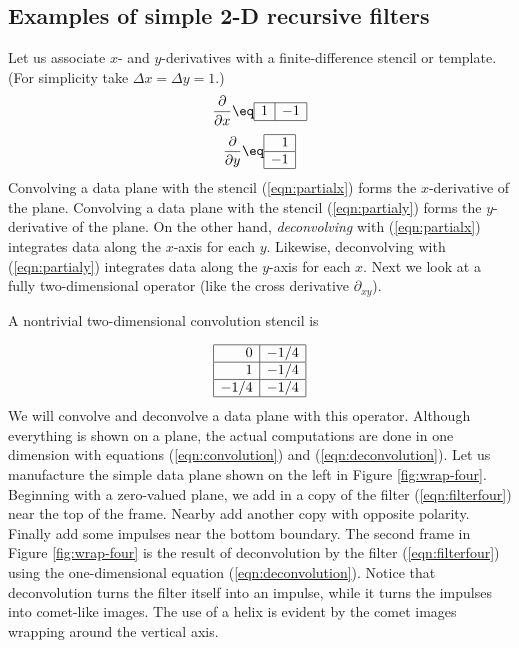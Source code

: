 \subsection{Examples of simple 2-D recursive filters}
Let us associate $x$- and $y$-derivatives with
a finite-difference stencil or template.
(For simplicity take $\Delta x=\Delta y=1$.)
\begin{equation}
 {\partial \over \partial x } \eq
 \begin{array}{|c|c|} \hline
   1    & -1
   \\ \hline
 \end{array}
 \label{eqn:partialx}
\end{equation}
\begin{equation}
  {\partial \over \partial y } \eq
  \begin{array}{|r|} \hline
    1  \\
    \hline
    -1
    \\ \hline
  \end{array}
  \label{eqn:partialy}
\end{equation}
Convolving a data plane with
the stencil (\ref{eqn:partialx})
forms the $x$-derivative of the plane.
Convolving a data plane with
the stencil (\ref{eqn:partialy})
forms the $y$-derivative of the plane.
On the other hand,
{\it deconvolving}
with (\ref{eqn:partialx}) integrates data along the $x$-axis for each $y$.
Likewise, deconvolving
with (\ref{eqn:partialy}) integrates data along the $y$-axis for each $x$.
Next we look at a fully two-dimensional operator
(like the cross derivative $\partial_{xy}$).


\par
A nontrivial two-dimensional convolution stencil is
\par
\begin{equation}
        \begin{array}{|r|r|}   \hline
                0    & -1/4 \\
                \hline
                1    & -1/4 \\
                \hline
                -1/4 & -1/4
                \\ \hline
        \end{array}
\label{eqn:filterfour}
\end{equation}
We will convolve and deconvolve a data plane with this operator.
Although everything is shown on a plane,
the actual computations are done in one dimension
with equations
(\ref{eqn:convolution}) and
(\ref{eqn:deconvolution}).
Let us manufacture the simple data plane
shown on the left in Figure \ref{fig:wrap-four}.
Beginning with a zero-valued plane, we add
in a copy of the filter (\ref{eqn:filterfour})
near the top of the frame.
Nearby add another copy with opposite polarity.
Finally add some impulses near the bottom boundary.
The second frame in Figure \ref{fig:wrap-four} is the result
of deconvolution by the filter (\ref{eqn:filterfour})
using the one-dimensional equation (\ref{eqn:deconvolution}).
Notice that deconvolution
turns the filter itself into an impulse,
while it turns the impulses
into comet-like images.
The use of a helix is evident
by the comet images wrapping around the vertical axis.


